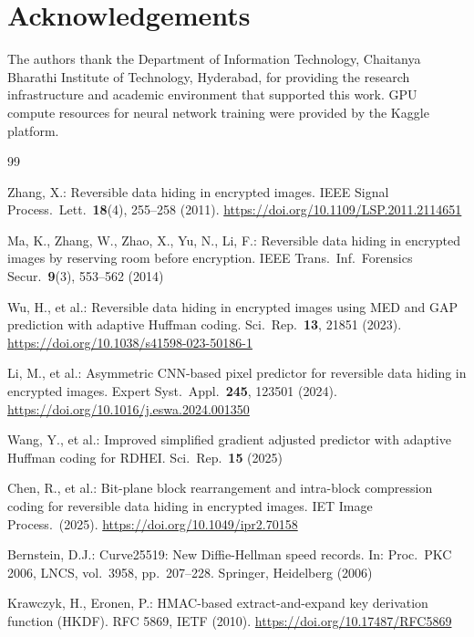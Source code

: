 \documentclass[runningheads]{llncs}
\begin{document}
\section*{Acknowledgements}
The authors thank the Department of Information Technology,
Chaitanya Bharathi Institute of Technology, Hyderabad, for
providing the research infrastructure and academic
environment that supported this work. GPU compute resources
for neural network training were provided by the Kaggle
platform.

\begin{thebibliography}{99}

Zhang, X.: Reversible data hiding in encrypted images.
IEEE Signal Process.\ Lett.\ \textbf{18}(4), 255--258 (2011).
\url{https://doi.org/10.1109/LSP.2011.2114651}

Ma, K., Zhang, W., Zhao, X., Yu, N., Li, F.: Reversible data
hiding in encrypted images by reserving room before
encryption. IEEE Trans.\ Inf.\ Forensics Secur.\ \textbf{9}(3),
553--562 (2014)

Wu, H., et al.: Reversible data hiding in encrypted images
using MED and GAP prediction with adaptive Huffman coding.
Sci.\ Rep.\ \textbf{13}, 21851 (2023).
\url{https://doi.org/10.1038/s41598-023-50186-1}

Li, M., et al.: Asymmetric CNN-based pixel predictor for
reversible data hiding in encrypted images. Expert Syst.\
Appl.\ \textbf{245}, 123501 (2024).
\url{https://doi.org/10.1016/j.eswa.2024.001350}

Wang, Y., et al.: Improved simplified gradient adjusted
predictor with adaptive Huffman coding for RDHEI. Sci.\
Rep.\ \textbf{15} (2025)

Chen, R., et al.: Bit-plane block rearrangement and
intra-block compression coding for reversible data hiding
in encrypted images. IET Image Process.\ (2025).
\url{https://doi.org/10.1049/ipr2.70158}

Bernstein, D.J.: Curve25519: New Diffie-Hellman speed
records. In: Proc.\ PKC 2006, LNCS, vol.\ 3958,
pp.\ 207--228. Springer, Heidelberg (2006)

Krawczyk, H., Eronen, P.: HMAC-based extract-and-expand
key derivation function (HKDF). RFC 5869, IETF (2010).
\url{https://doi.org/10.17487/RFC5869}


\end{thebibliography}
\end{document}
